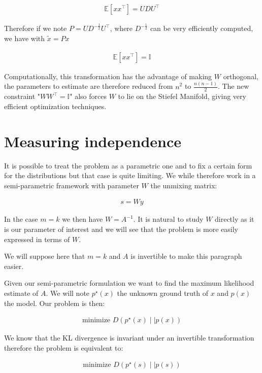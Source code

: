 \documentclass[a4paper,BCOR=5mm,oneside,openany]{scrreprt}
\begin{document}
\begin{align*}
	\mathbb{E} \left[ x x^\intercal \right] = U D U^\intercal
\end{align*}

Therefore if we note $P = U D^{-\frac{1}{2}} U^\intercal$, where $D^{-\frac{1}{2}}$ can be very efficiently computed, we have with $\tilde{x} = P x$

\begin{align*}
	\mathbb{E} \left[ x x^\intercal \right] = \mathbb{I}
\end{align*}

Computationally, this transformation has the advantage of making $W$ orthogonal, the parameters to estimate are therefore reduced from $n^2$ to $\frac{n (n-1)}{2}$. The new constraint "$W W^\intercal = \mathbb{I}$" also forces $W$ to lie on the Stiefel Manifold, giving very efficient optimization techniques.

\chapter{Measuring independence}

It is possible to treat the problem as a parametric one and to fix a certain form for the distributions but that case is quite limiting. We while therefore work in a semi-parametric framework with parameter $W$ the unmixing matrix:

\begin{align*}
	s = W y
\end{align*}

In the case $m = k$ we then have $W = A^{-1}$. It is natural to study $W$ directly as it is our parameter of interest and we will see that the problem is more easily expressed in terms of $W$.

We will suppose here that $m = k$ and $A$ is invertible to make this paragraph easier.

Given our semi-parametric formulation we want to find the maximum likelihood estimate of $A$. We will note $p^\star (x)$ the unknown ground truth of $x$ and $p(x)$ the model. Our problem is then:

\begin{align*}
	\text{minimize } D \left(p^\star(x) \mid \mid p(x) \right)
\end{align*}

We know that the KL divergence is invariant under an invertible transformation therefore the problem is equivalent to:

\begin{align*}
	\text{minimize } D \left(p^\star(s) \mid \mid p(s) \right)
\end{align*}
\end{document}
